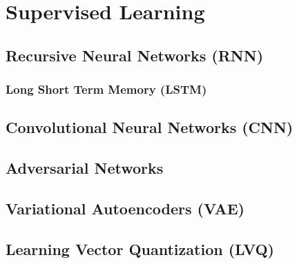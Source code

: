\section{Supervised Learning}
\label{additional:supervised}

\subsection{Recursive Neural Networks (RNN)}
\label{additional:supervised:RNN}

\subsubsection{Long Short Term Memory (LSTM)}
\label{additional:supervised:RNN:LSTM}

\subsection{Convolutional Neural Networks (CNN)}
\label{additional:supervised:CNN}

\subsection{Adversarial Networks}
\label{additional:supervised:AN}

\subsection{Variational Autoencoders (VAE)}
\label{additional:supervised:VAE}

\subsection{Learning Vector Quantization (LVQ)}
\label{additional:supervised:kNN:LVQ}

